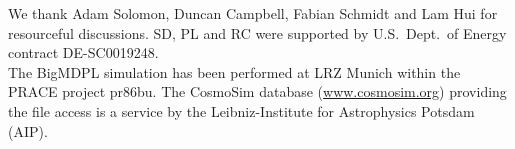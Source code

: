 \documentclass[prd,amsmath,amssymb,floatfix,superscriptaddress,nofootinbib,twocolumn]{revtex4-1}
\begin{document}
\acknowledgements
\noindent We thank Adam Solomon, Duncan Campbell, Fabian Schmidt and Lam Hui for resourceful discussions.  SD, PL and RC were supported by U.S.\ Dept.\ of Energy contract DE-SC0019248.\\
The BigMDPL simulation has been performed at LRZ Munich within the PRACE project pr86bu. The CosmoSim database (\url{www.cosmosim.org}) providing the file access is a service by the Leibniz-Institute for Astrophysics Potsdam (AIP).
%

\end{document}
